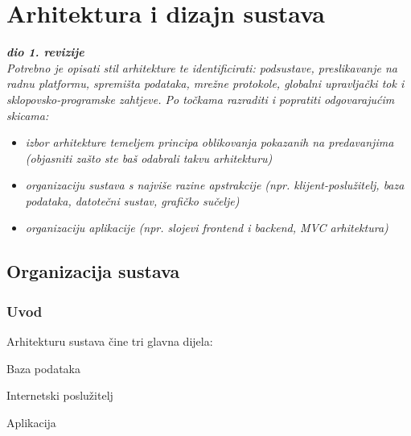 \chapter{Arhitektura i dizajn sustava}
		
		\textbf{\textit{dio 1. revizije}}\\

		\textit{ Potrebno je opisati stil arhitekture te identificirati: podsustave, preslikavanje na radnu platformu, spremišta podataka, mrežne protokole, globalni upravljački tok i sklopovsko-programske zahtjeve. Po točkama razraditi i popratiti odgovarajućim skicama:}
	\begin{itemize}
		\item 	\textit{izbor arhitekture temeljem principa oblikovanja pokazanih na predavanjima (objasniti zašto ste baš odabrali takvu arhitekturu)}
		\item 	\textit{organizaciju sustava s najviše razine apstrakcije (npr. klijent-poslužitelj, baza podataka, datotečni sustav, grafičko sučelje)}
		\item 	\textit{organizaciju aplikacije (npr. slojevi frontend i backend, MVC arhitektura) }		
	\end{itemize}
		
		\section{Organizacija sustava}
			\subsection{Uvod}
				Arhitekturu sustava čine tri glavna dijela:
				\begin{packed_item}
					\item Baza podataka
					\item Internetski poslužitelj
					\item Aplikacija
				\end{packed_item}
			

